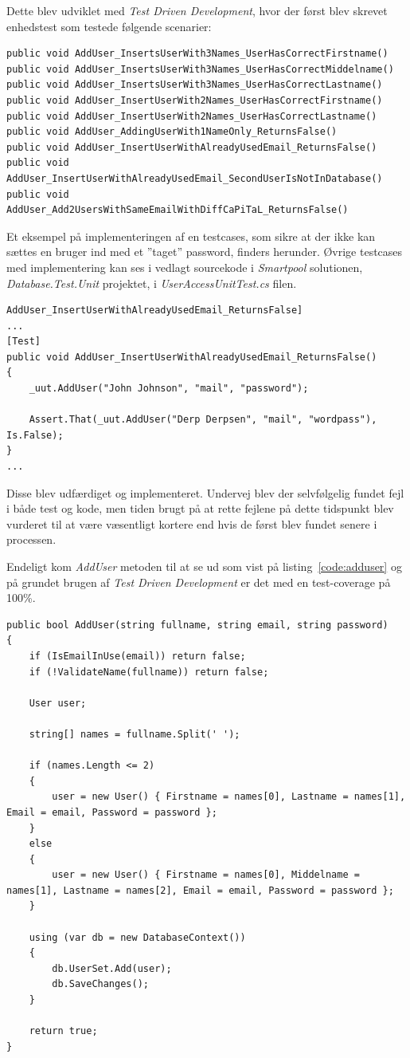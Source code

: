 Dette blev udviklet med \textit{Test Driven Development}, hvor der først blev skrevet enhedstest som testede følgende scenarier: 

\begin{lstlisting}[caption=Testcases til \textit{AddUser} metoden.,label=code:addusertestcases]
public void AddUser_InsertsUserWith3Names_UserHasCorrectFirstname()
public void AddUser_InsertsUserWith3Names_UserHasCorrectMiddelname()
public void AddUser_InsertsUserWith3Names_UserHasCorrectLastname()
public void AddUser_InsertUserWith2Names_UserHasCorrectFirstname()
public void AddUser_InsertUserWith2Names_UserHasCorrectLastname()
public void AddUser_AddingUserWith1NameOnly_ReturnsFalse()
public void AddUser_InsertUserWithAlreadyUsedEmail_ReturnsFalse()
public void AddUser_InsertUserWithAlreadyUsedEmail_SecondUserIsNotInDatabase()
public void AddUser_Add2UsersWithSameEmailWithDiffCaPiTaL_ReturnsFalse()
\end{lstlisting}

Et eksempel på implementeringen af en testcases, som sikre at der ikke kan sættes en bruger ind med et ''taget'' password, finders herunder. Øvrige testcases med implementering kan ses i vedlagt sourcekode i \textit{Smartpool} solutionen, \textit{Database.Test.Unit} projektet, i \textit{UserAccessUnitTest.cs} filen.

\begin{lstlisting}[caption=Test for metoden] AddUser_InsertUserWithAlreadyUsedEmail_ReturnsFalse]
...
[Test]
public void AddUser_InsertUserWithAlreadyUsedEmail_ReturnsFalse()
{
	_uut.AddUser("John Johnson", "mail", "password");
	
	Assert.That(_uut.AddUser("Derp Derpsen", "mail", "wordpass"), Is.False);
}
...
\end{lstlisting}

Disse blev udfærdiget og implementeret. Undervej blev der selvfølgelig fundet fejl i både test og kode, men tiden brugt på at rette fejlene på dette tidspunkt blev vurderet til at være væsentligt kortere end hvis de først blev fundet senere i processen. 

Endeligt kom \textit{AddUser} metoden til at se ud som vist på listing~\ref{code:adduser} og på grundet brugen af \textit{Test Driven Development} er det med en test-coverage på 100\%.

\begin{lstlisting}[caption=\textit{AddUser} metoden,label=code:adduser]
public bool AddUser(string fullname, string email, string password)
{
	if (IsEmailInUse(email)) return false;
	if (!ValidateName(fullname)) return false;
	
	User user;
	
	string[] names = fullname.Split(' ');
	
	if (names.Length <= 2)
	{
		user = new User() { Firstname = names[0], Lastname = names[1], Email = email, Password = password };
	}
	else
	{
		user = new User() { Firstname = names[0], Middelname = names[1], Lastname = names[2], Email = email, Password = password };
	}
	
	using (var db = new DatabaseContext())
	{
		db.UserSet.Add(user);
		db.SaveChanges();
	}
	
	return true;
}
\end{lstlisting}

